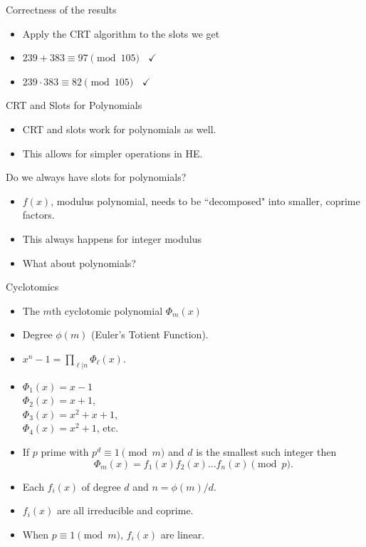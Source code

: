 \documentclass[ %
usenames,dvipsnames,
aspectratio=169,11pt]{beamer}
\newenvironment{stepitemize}{\begin{itemize}[<+->]}{\end{itemize} }
\begin{document}
\begin{frame}{Correctness of the results}
\begin{stepitemize}
    \item Apply the CRT algorithm to the slots we get 
    \item $239+383 \equiv 97 \pmod{105} \:\:\:\: \checkmark$
    \item $239\cdot 383 \equiv 82\pmod{105} \:\:\:\: \checkmark$
\end{stepitemize}
    
\end{frame}
\begin{frame}{CRT and Slots for Polynomials}
\begin{stepitemize}
    \item CRT and slots work for polynomials as well. 
    \item This allows for simpler operations in HE.
\end{stepitemize}
\end{frame}

\begin{frame}{Do we always have slots for polynomials?}
    \begin{stepitemize}
    \item $f(x)$, modulus polynomial, needs to be ``decomposed" into smaller, coprime factors.
    \item This always happens for integer modulus
    \item What about polynomials?
    \end{stepitemize}
\end{frame}

\begin{frame}{Cyclotomics}
    \begin{stepitemize}
    \item The $m$th cyclotomic polynomial $\Phi_m(x)$
    \item Degree $\phi(m)$ (Euler's Totient Function).
    \item $x^n-1 = \prod_{\ell|n}\Phi_{\ell}(x)$.
    \item $\Phi_1(x)=x-1$ 
    \\ $\Phi_2(x)=x+1$, 
    \\ $\Phi_3(x)=x^2+x+1$, \\
    $\Phi_4(x)= x^2+1$, etc.
    \item If $p$ prime with $p^d\equiv 1\pmod{m}$ and $d$ is the smallest such integer then 
    $$\Phi_m(x) = f_1(x)f_2(x) \dots f_n(x) \pmod{p}.$$
    \item Each $f_i(x)$ of degree $d$ and $n=\phi(m)/d$.
    \item $f_i(x)$ are all irreducible and coprime.
    \item When $p\equiv 1\pmod{m}$, $f_i(x)$ are linear.
    \end{stepitemize}
\end{frame}
\end{document}
